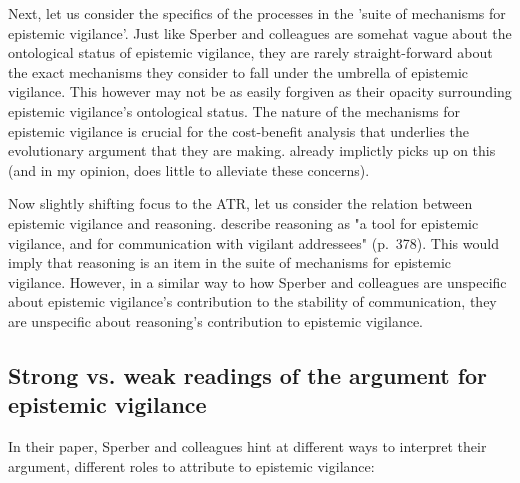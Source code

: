 Next, let us consider the specifics of the processes in the 'suite of mechanisms for epistemic vigilance'. Just like Sperber and colleagues are somehat vague about the ontological status of epistemic vigilance, they are rarely straight-forward about the exact mechanisms they consider to fall under the umbrella of epistemic vigilance. This however may not be as easily forgiven as their opacity surrounding epistemic vigilance's ontological status. The nature of the mechanisms for epistemic vigilance is crucial for the cost-benefit analysis that underlies the evolutionary argument that they are making. \citet{Michaelian13} already implictly picks up on this (and in my opinion, \citet{Sperber13} does little to alleviate these concerns).

Now slightly shifting focus to the ATR, let us consider the relation between epistemic vigilance and reasoning. \citet{Sperber10} describe reasoning as "a tool for epistemic vigilance, and for communication with vigilant addressees" (p.~378). This would imply that reasoning is an item in the suite of mechanisms for epistemic vigilance. However, in a similar way to how Sperber and colleagues are unspecific about epistemic vigilance's contribution to the stability of communication, they are unspecific about reasoning's contribution to epistemic vigilance.

\subsection{Strong vs. weak readings of the argument for epistemic vigilance}

In their \citeyear{Sperber10} paper, Sperber and colleagues hint at different ways to interpret their argument, different roles to attribute to epistemic vigilance:

